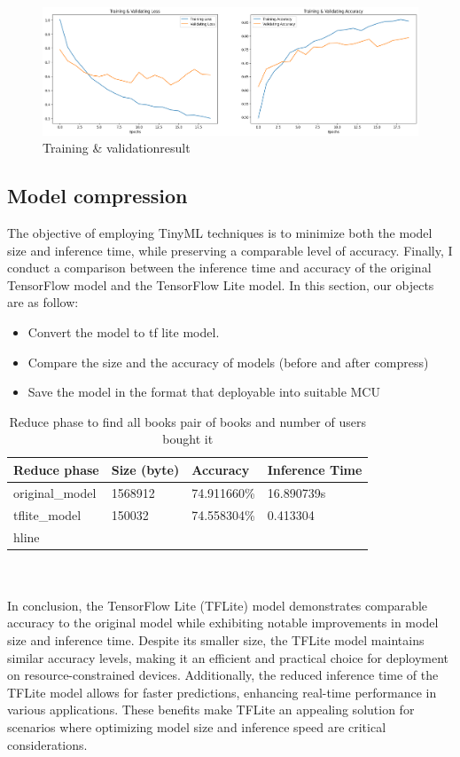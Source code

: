 \begin{center}
    \begin{figure}[!htp]
        \centering
        \includegraphics[width=0.8 \textwidth]{image/training_validating.png}
        \caption{Training \& validationresult}
        \label{subsection}
    \end{figure}
    \end{center}

\subsection{Model compression}
The objective of employing TinyML techniques is to minimize both the model size and inference time, while preserving a comparable level of accuracy.
Finally, I conduct a comparison between the inference time and accuracy of the original TensorFlow model and the TensorFlow Lite model. In this section, our objects are as follow:

\begin{itemize}
    \item Convert the model to tf lite model.
    \item Compare the size and the accuracy of models (before and after compress)
    \item Save the model in the format that deployable into suitable MCU
\end{itemize}

    \begin{table}[H]
        \centering
        \begin{tabular}{|l|l|l|l|}
            \hline
            \textbf{Reduce phase} & Size (byte) & Accuracy & Inference Time  \\ \hline
             original_model & 1568912 & 74.911660\% & 16.890739s \\
             tflite_model & 150032 & 74.558304\% & 0.413304 \\ hline
        \end{tabular}
        \caption{Reduce phase to find all books pair of books and number of users bought it}
        \label{tab:my_label}
    \end{table}

\\
\\
In conclusion, the TensorFlow Lite (TFLite) model demonstrates comparable accuracy to the original model while exhibiting notable improvements in model size and inference time. Despite its smaller size, the TFLite model maintains similar accuracy levels, making it an efficient and practical choice for deployment on resource-constrained devices. Additionally, the reduced inference time of the TFLite model allows for faster predictions, enhancing real-time performance in various applications. 
These benefits make TFLite an appealing solution for scenarios where optimizing model size and inference speed are critical considerations.